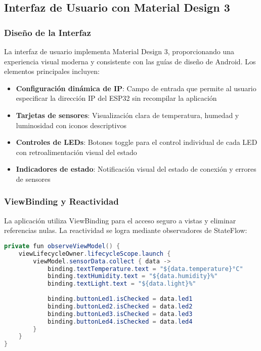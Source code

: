 \documentclass[conference,a4paper]{IEEEtran}
\begin{document}
\subsection{Interfaz de Usuario con Material Design 3}

\subsubsection{Dise\~{n}o de la Interfaz}

La interfaz de usuario implementa Material Design 3, proporcionando una experiencia visual moderna y consistente con las gu\'ias de dise\~{n}o de Android. Los elementos principales incluyen:

\begin{itemize}
    \item \textbf{Configuraci\'on din\'amica de IP}: Campo de entrada que permite al usuario especificar la direcci\'on IP del ESP32 sin recompilar la aplicaci\'on
    \item \textbf{Tarjetas de sensores}: Visualizaci\'on clara de temperatura, humedad y luminosidad con iconos descriptivos
    \item \textbf{Controles de LEDs}: Botones toggle para el control individual de cada LED con retroalimentaci\'on visual del estado
    \item \textbf{Indicadores de estado}: Notificaci\'on visual del estado de conexi\'on y errores de sensores
\end{itemize}

\subsubsection{ViewBinding y Reactividad}

La aplicaci\'on utiliza ViewBinding para el acceso seguro a vistas y eliminar referencias nulas. La reactividad se logra mediante observadores de StateFlow:

\begin{lstlisting}[style=arduino, caption=Binding reactivo en el Fragment, language=Java]
private fun observeViewModel() {
    viewLifecycleOwner.lifecycleScope.launch {
        viewModel.sensorData.collect { data ->
            binding.textTemperature.text = "${data.temperature}°C"
            binding.textHumidity.text = "${data.humidity}%"
            binding.textLight.text = "${data.light}%"
            
            binding.buttonLed1.isChecked = data.led1
            binding.buttonLed2.isChecked = data.led2
            binding.buttonLed3.isChecked = data.led3
            binding.buttonLed4.isChecked = data.led4
        }
    }
}
\end{lstlisting}
\end{document}

